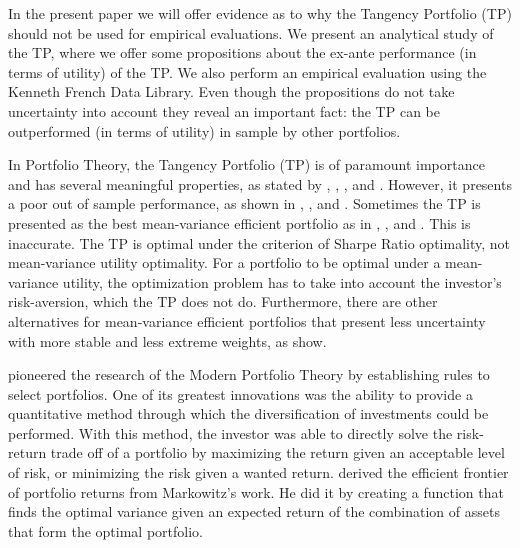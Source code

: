 \documentclass[12pt,oneside,a4paper]{memoir}
\begin{document}

In the present paper we will offer evidence as to why the Tangency Portfolio (TP) should not be used for empirical evaluations.
We present an analytical study of the TP, where we offer some propositions about the ex-ante performance (in terms of utility) of the TP.
We also perform an empirical evaluation using the Kenneth French Data Library.
Even though the propositions do not take uncertainty into account they reveal an important fact: the TP can be outperformed (in terms of utility) in sample by other portfolios.

In Portfolio Theory, the Tangency Portfolio (TP) is of paramount importance and has several meaningful properties, as stated by , , , and .
However, it presents a poor out of sample performance, as shown in , , and .
Sometimes the TP is presented as the best mean-variance efficient portfolio as in , , and .
This is inaccurate.
The TP is optimal under the criterion of Sharpe Ratio optimality, not mean-variance utility optimality.
For a portfolio to be optimal under a mean-variance utility, the optimization problem has to take into account the investor's risk-aversion, which the TP does not do.
Furthermore, there are other alternatives for mean-variance efficient portfolios that present less uncertainty with more stable and less extreme weights, as  show.

 pioneered the research of the Modern Portfolio Theory by establishing rules to select portfolios. One of its greatest innovations was the ability to provide a quantitative method through which the diversification of investments could be performed. With this method, the investor was able to directly solve the risk-return trade off of a portfolio by maximizing the return given an acceptable level of risk, or minimizing the risk given a wanted return.
 derived the efficient frontier of portfolio returns from Markowitz's work.
He did it by creating a function that finds the optimal variance given an expected return of the combination of assets that form the optimal portfolio.
\end{document}
